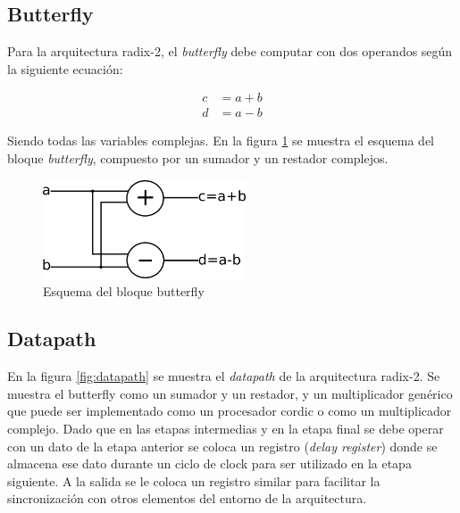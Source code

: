 \subsection{Butterfly}

Para la arquitectura radix-2, el \textit{butterfly} debe computar con dos operandos según la
siguiente ecuación:

\begin{equation}
\begin{split}
c &= a+b \\
d &= a-b
\end{split}
\label{eq:butterf}
\end{equation}

Siendo todas las variables complejas. En la figura \ref{fig:butterfly_esq} se muestra el esquema del
bloque \textit{butterfly}, compuesto por un sumador y un restador complejos.

\begin{figure}[htb!]
        \centering
        \includegraphics[width=6cm]{./figures/butterfly_esq.png}
        \caption{Esquema del bloque butterfly}
        \label{fig:butterfly_esq}
\end{figure}

\subsection{Datapath} \label{sec:datapath}

En la figura \ref{fig:datapath} se muestra el \textit{datapath} de la arquitectura radix-2. Se muestra el
butterfly como un sumador y un restador, y un multiplicador genérico que puede ser implementado como
un procesador cordic o como un multiplicador complejo. Dado que en las etapas intermedias y en la
etapa final se debe operar con un dato de la etapa anterior se coloca un registro (\textit{delay
register}) donde se almacena ese dato durante un ciclo de clock para ser utilizado en la etapa siguiente. 
A la salida se le coloca un registro similar para facilitar la
sincronización con otros elementos del entorno de la arquitectura.

